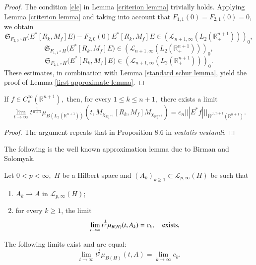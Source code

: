 \documentclass{amsart}
\begin{document}
\begin{proof}
The condition \eqref{clc} in Lemma \ref{criterion lemma} trivially holds. Applying Lemma \ref{criterion lemma}
and taking into account that $F_{1,1}(0)=F_{2,1}(0)=0$, we obtain
$$\mathfrak{S}_{F_{2,0}\circ H}\Big(E^{\ast}[R_k,M_f]E\Big)-F_{2,0}(0) E^{\ast}[R_k,M_f]E\in (\mathcal{L}_{n+1,\infty}(L_2(\mathbb{R}^{n+1}_+)))_0,$$
$$\mathfrak{S}_{F_{1,1}\circ H}\Big(  E^{\ast}[R_k,M_f]E\Big)\in (\mathcal{L}_{n+1,\infty}(L_2(\mathbb{R}^{n+1}_+)))_0,$$
$$\mathfrak{S}_{F_{2,1}\circ H}\Big(  E^{\ast}[R_k,M_f]E\Big)\in (\mathcal{L}_{n+1,\infty}(L_2(\mathbb{R}^{n+1}_+)))_0.$$
These estimates, in combination with Lemma \ref{standard schur lemma}, yield the proof of Lemma \ref{first approximate lemma}.
\end{proof}

\begin{lemma}\label{from frank lemma} If $f\in C^{\infty}_c(\mathbb{R}^{n+1}),$ then, for every $1\leq k\leq n+1,$ there exists a limit
$$\lim_{t\to\infty}t^{\frac1{n+1}}\mu_{B(L_2(\mathbb{R}^{n+1}))}(t, M_{\chi_{\mathbb{R}^{n+1}_+}}[R_k,M_f]M_{\chi_{\mathbb{R}^{n+1}_+}})=c_n|||E^{\ast}f|||_{\dot{W}^{1,n+1}(\mathbb{R}^{n+1})}.$$
\end{lemma}
\begin{proof} The argument repeats that in Proposition 8.6 in \cite{FSZ} {\it mutatis mutandi}.
\end{proof}

The following is the well known approximation lemma due to Birman and Solomyak.

\begin{lemma}\label{approlem}
Let $0<p<\infty,$ $H$ be a Hilbert space and $(A_k)_{k\geq 1}\subset \mathcal{L}_{p,\infty}(H)$ be such that
\begin{enumerate}[{\rm (i)}]
\item $A_k\rightarrow A$ in $\mathcal{L}_{p,\infty}(H)$;
\item for every $k\geq 1$, the limit
$$\lim_{t\rightarrow \infty}t^{\frac{1}{p}}\mu_{B(H)}(t,A_k)=c_k,\quad {\rm exists},$$
\end{enumerate}
The following limits exist and are equal:
$$\lim_{t\rightarrow \infty}t^{\frac{1}{p}}\mu_{B(H)}(t,A)=\lim_{k\rightarrow \infty}c_k.$$
\end{lemma}
\end{document}
